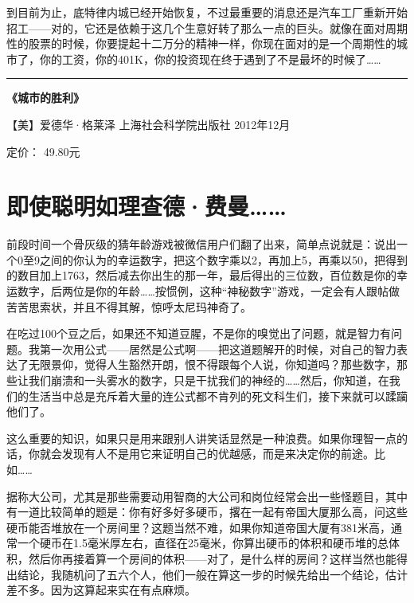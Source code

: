 到目前为止，底特律内城已经开始恢复，不过最重要的消息还是汽车工厂重新开始招工------对的，它还是依赖于这几个生意好转了那么一点的巨头。就像在面对周期
性的股票的时候，你要提起十二万分的精神一样，你现在面对的是一个周期性的城市了，你的工资，你的401K，你的投资现在终于遇到了不是最坏的时候了\ldots\ldots{}

\begin{center}\rule{0.5\linewidth}{0.5pt}\end{center}

\textbf{《城市的胜利》}

【美】爱德华·格莱泽 上海社会科学院出版社 2012年12月

定价： 49.80元

\hypertarget{ux5373ux4f7fux806aux660eux5982ux7406ux67e5ux5fb7ux8d39ux66fc}{%
\section{即使聪明如理查德·费曼\ldots\ldots{}}\label{ux5373ux4f7fux806aux660eux5982ux7406ux67e5ux5fb7ux8d39ux66fc}}

前段时间一个骨灰级的猜年龄游戏被微信用户们翻了出来，简单点说就是：说出一个0至9之间的你认为的幸运数字，把这个数字乘以2，再加上5，再乘以50，把得到的数目加上1763，然后减去你出生的那一年，最后得出的三位数，百位数是你的幸运数字，后两位是你的年龄\ldots\ldots 按惯例，这种``神秘数字''游戏，一定会有人跟帖做苦苦思索状，并且不得其解，惊呼太尼玛神奇了。

在吃过100个豆之后，如果还不知道豆腥，不是你的嗅觉出了问题，就是智力有问题。我第一次用公式------居然是公式啊------把这道题解开的时候，对自己的智力表达了无限景仰，觉得人生豁然开朗，恨不得跟每个人说，你知道吗？那些数字，那些让我们崩溃和一头雾水的数字，只是干扰我们的神经的\ldots\ldots 然后，你知道，在我们的生活当中总是充斥着大量的连公式都不肯列的死文科生们，接下来就可以蹂躏他们了。

这么重要的知识，如果只是用来跟别人讲笑话显然是一种浪费。如果你理智一点的话，你就会发现有人不是用它来证明自己的优越感，而是来决定你的前途。比如\ldots\ldots{}

据称大公司，尤其是那些需要动用智商的大公司和岗位经常会出一些怪题目，其中有一道比较简单的题是：你有好多好多硬币，撂在一起有帝国大厦那么高，问这些硬币能否堆放在一个房间里？这题当然不难，如果你知道帝国大厦有381米高，通常一个硬币在1.5毫米厚左右，直径在25毫米，你算出硬币的体积和硬币堆的总体积，然后你再接着算一个房间的体积------对了，是什么样的房间？这样当然也能得出结论，我随机问了五六个人，他们一般在算这一步的时候先给出一个结论，估计差不多。因为这算起来实在有点麻烦。

